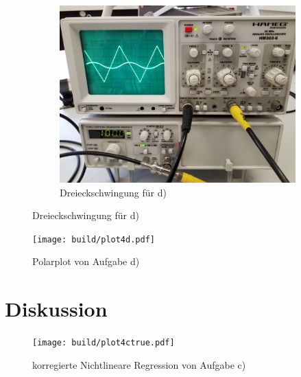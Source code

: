\begin{figure}[H]
\begin{subfigure}{0.48\linewidth}
      \includegraphics[width=\textwidth]{images/dreieck.jpg}
      \centering
      \caption{Dreieckschwingung für d)}  
    \end{subfigure}
  \end{figure}

  \begin{figure}[H]
    \texttt{[image: build/plot4d.pdf]}
    \centering
    \caption{Polarplot von Aufgabe d)}
    \label{fig:4d}
  \end{figure}

  


\section{Diskussion}


  \begin{figure}[H]
    \texttt{[image: build/plot4ctrue.pdf]}
    \centering
    \caption{korregierte Nichtlineare Regression von Aufgabe c)}
    \label{fig:4ctrue}
  \end{figure}

\newpage
\nocite{V353}
\nocite{scipy}
\printbibliography

